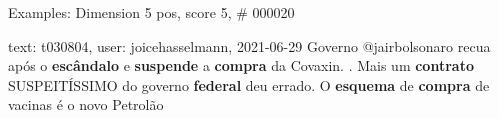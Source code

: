 \begin{frame}{Examples: Dimension 5 pos, score 5, \# 000020}
\footnotesize
\begin{exampleblock}{text: t030804, user: joicehasselmann, 2021-06-29}
 Governo @jairbolsonaro recua após o \textbf{escândalo} 
e \textbf{suspende} a \textbf{compra} da Covaxin. . Mais um \textbf{contrato} 
SUSPEITÍSSIMO do governo \textbf{federal} deu errado. O \textbf{esquema} de 
\textbf{compra} de vacinas é o novo Petrolão 
\end{exampleblock}
\end{frame}
